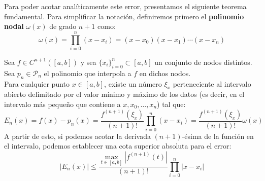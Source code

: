 
Para poder acotar analíticamente este error, presentamos el siguiente teorema fundamental. Para simplificar la notación, definiremos primero el \textbf{polinomio nodal} $\omega(x)$ de grado $n+1$ como:
\[
    \omega(x) = \prod_{i=0}^n (x - x_i) = (x-x_0)(x-x_1)\cdots(x-x_n)
\]

\begin{teorema}
    Sea $f \in C^{n+1}([a,b])$ y sea $\{ x_i \}_{i=0}^n \subset [a,b]$ un conjunto de nodos distintos. Sea $p_n \in \mathcal{P}_n$ el polinomio que interpola a $f$ en dichos nodos.\\
    Para cualquier punto $x \in [a,b]$, existe un número $\xi_x$ perteneciente al intervalo abierto delimitado por el valor mínimo y máximo de los datos (es decir, en el intervalo más pequeño que contiene a $x, x_0, \dots, x_n$) tal que:
    \[
        E_n(x) = f(x) - p_n(x) = \frac{f^{(n+1)}(\xi_x)}{(n+1)!} \prod_{i=0}^n (x - x_i) = \frac{f^{(n+1)}(\xi_x)}{(n+1)!} \omega(x)
    \]
    A partir de esto, si podemos acotar la derivada $(n+1)$-ésima de la función en el intervalo, podemos establecer una cota superior absoluta para el error:
    \[
        |E_n(x)| \leq \frac{ \max_{t \in [a,b]} |f^{(n+1)}(t)| }{(n+1)!} \prod_{i=0}^n |x - x_i|
    \]
\end{teorema}

